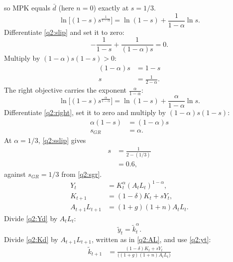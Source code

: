 \begin{sol}
so MPK equals $\bar d$ (here $n=0$) exactly at $s=1/3$.
\begin{equation}
\ln\big[(1-s)s^{\frac1{1-\alpha}}\big]=\ln(1-s)+\frac{1}{1-\alpha}\ln s. \label{q2:slip}
\end{equation}
Differentiate \eqref{q2:slip} and set it to zero:
\[
-\frac1{1-s}+\frac{1}{(1-\alpha)s}=0 .
\]
Multiply by $(1-\alpha)s(1-s)>0$:
\begin{align}
(1-\alpha)s &= 1-s\nonumber\\
s &= \frac1{2-\alpha}. \label{q2:sslip}
\end{align}
The right objective carries the exponent $\frac{\alpha}{1-\alpha}$:
\begin{equation}
\ln\big[(1-s)s^{\frac{\alpha}{1-\alpha}}\big]=\ln(1-s)+\frac{\alpha}{1-\alpha}\ln s. \label{q2:right}
\end{equation}
Differentiate \eqref{q2:right}, set it to zero and multiply by $(1-\alpha)s(1-s)$:
\begin{align}
\alpha(1-s) &= (1-\alpha)s\nonumber\\
s_{GR} &= \alpha. \label{q2:sgr}
\end{align}
At $\alpha=1/3$, \eqref{q2:sslip} gives
\begin{align*}
s &= \frac1{2-(1/3)}\\
&= 0.6,
\end{align*}
against $s_{GR}=1/3$ from \eqref{q2:sgr}.
\begin{align}
Y_t &= K_t^\alpha(A_tL_t)^{1-\alpha}, \label{q2:Yd}\\
K_{t+1} &= (1-\delta)K_t+sY_t, \label{q2:Kd}\\
A_{t+1}L_{t+1} &= (1+g)(1+n)A_tL_t. \label{q2:AL}
\end{align}
Divide \eqref{q2:Yd} by $A_tL_t$:
\begin{equation}
\tilde y_t=\tilde k_t^\alpha. \label{q2:yt}
\end{equation}
Divide \eqref{q2:Kd} by $A_{t+1}L_{t+1}$, written as in \eqref{q2:AL}, and use \eqref{q2:yt}:
\begin{align}
\tilde k_{t+1} &= \frac{(1-\delta)K_t+sY_t}{\big((1+g)(1+n)A_tL_t\big)}\nonumber\\

\end{align}
\end{sol}
